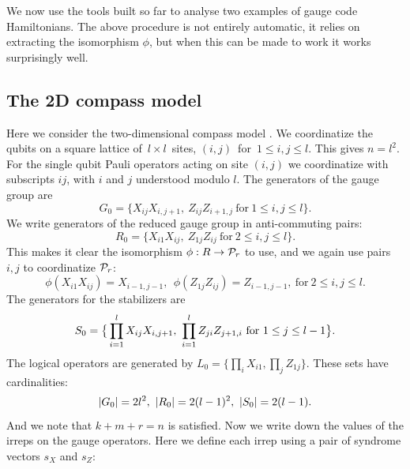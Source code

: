 We now use the tools built so far
to analyse two examples of gauge code Hamiltonians.
The above procedure is not entirely automatic,
it relies on extracting the isomorphism $\phi$,
but when this can be made to work it works surprisingly well.

%
%

\subsection{The 2D compass model}

Here we consider the two-dimensional compass model \cite{Bacon2006}.
We coordinatize the qubits on a square 
lattice of\ $l\times l$\ sites,
$(i, j)$\ for\ $1\le i, j\le l.$
This gives $n = l^2.$
For the single qubit Pauli operators acting on site
$(i, j)$ we coordinatize with subscripts $ij$, 
with $i$ and $j$ understood modulo $l$.
The generators of the gauge group are
$$
    G_0 = \big\{ X_{ij}X_{i,j+1},\ Z_{ij}Z_{i+1,j}\ \mbox{for}\ 1\le i, j\le l\big\}.
$$
We write generators of the reduced
gauge group in anti-commuting pairs:
$$
    R_0 = \big\{ X_{i1}X_{ij},\ Z_{1j}Z_{ij}\ \mbox{for}\ 2\le i, j\le l\big\}.
$$
This makes it clear the isomorphism $\phi : R \to \mathcal{P}_r$ to use,
and we again use pairs $i,j$ to coordinatize $\mathcal{P}_r$:
$$
    \phi(X_{i1}X_{ij}) = X_{i-1,j-1}, \ \ \phi(Z_{1j}Z_{ij}) = Z_{i-1,j-1},\ \mbox{for}\ 2\le i, j\le l.
$$
The generators for the stabilizers are
$$
    \Stab_0 = \big\{ \prod_{i=1}^l X_{ij}X_{i,j+1},\ \prod_{i=1}^l Z_{ji}Z_{j+1,i}\ \mbox{for}\ 1\le j\le l-1\big\}.
$$
The logical operators are generated by $L_0 = \big\{ \prod_i X_{i1}, \prod_j Z_{1j} \}.$
These sets have cardinalities:
$$|G_0|=2l^2,\ |R_0| = 2(l-1)^2,\ |\Stab_0| = 2(l-1).$$
And we note that $k+m+r=n$ is satisfied.
Now we write down the values of the
irreps on the gauge operators.
Here we define each irrep using a pair 
of syndrome vectors $s_X$ and $s_Z:$
